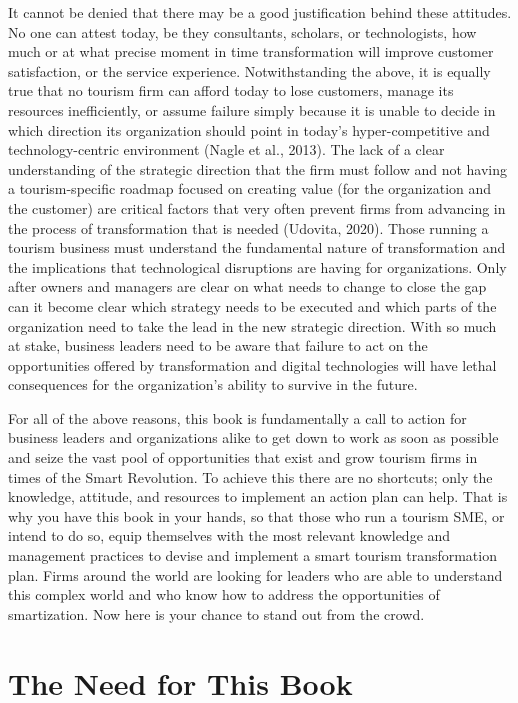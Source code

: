 \documentclass[
  letterpaper,
  DIV=11,
  numbers=noendperiod]{scrreprt}
\begin{document}
It cannot be denied that there may be a good justification behind these
attitudes. No one can attest today, be they consultants, scholars, or
technologists, how much or at what precise moment in time transformation
will improve customer satisfaction, or the service experience.
Notwithstanding the above, it is equally true that no tourism firm can
afford today to lose customers, manage its resources inefficiently, or
assume failure simply because it is unable to decide in which direction
its organization should point in today's hyper-competitive and
technology-centric environment (Nagle et al., 2013). The lack of a clear
understanding of the strategic direction that the firm must follow and
not having a tourism-specific roadmap focused on creating value (for the
organization and the customer) are critical factors that very often
prevent firms from advancing in the process of transformation that is
needed (Udovita, 2020). Those running a tourism business must understand
the fundamental nature of transformation and the implications that
technological disruptions are having for organizations. Only after
owners and managers are clear on what needs to change to close the gap
can it become clear which strategy needs to be executed and which parts
of the organization need to take the lead in the new strategic
direction. With so much at stake, business leaders need to be aware that
failure to act on the opportunities offered by transformation and
digital technologies will have lethal consequences for the
organization's ability to survive in the future.

For all of the above reasons, this book is fundamentally a call to
action for business leaders and organizations alike to get down to work
as soon as possible and seize the vast pool of opportunities that exist
and grow tourism firms in times of the Smart Revolution. To achieve this
there are no shortcuts; only the knowledge, attitude, and resources to
implement an action plan can help. That is why you have this book in
your hands, so that those who run a tourism SME, or intend to do so,
equip themselves with the most relevant knowledge and management
practices to devise and implement a smart tourism transformation plan.
Firms around the world are looking for leaders who are able to
understand this complex world and who know how to address the
opportunities of smartization. Now here is your chance to stand out from
the crowd.

\hypertarget{the-need-for-this-book}{%
\chapter{The Need for This Book}\label{the-need-for-this-book}}
\end{document}
